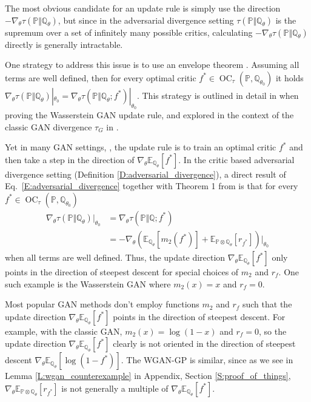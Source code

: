\documentclass{article}
\DeclareMathOperator{\oc}{OC}
\begin{document}
 The most obvious candidate for an update rule is simply use the direction $-\nabla_\theta\tau(\mathbb P\Vert\mathbb Q_\theta)$,
 but since in the adversarial divergence setting $\tau(\mathbb P\Vert\mathbb Q_\theta)$ is the supremum over a set of infinitely many possible critics,
 calculating $-\nabla_\theta\tau(\mathbb P\Vert\mathbb Q_\theta)$ directly is generally intractable.

 One strategy to address this issue is to use an envelope theorem \cite{milgrom2002envelope}.
 Assuming all terms are well defined, then for every optimal critic $f^*\in\oc_{\tau}(\mathbb P,\mathbb Q_{\theta_0})$
 it holds $\nabla_\theta\tau(\mathbb P\Vert\mathbb Q_\theta)|_{\theta_0}=\nabla_\theta\tau(\mathbb P\Vert\mathbb Q_\theta;f^*)|_{\theta_0}$.
 This strategy is outlined in detail in \cite{arjovsky2017wasserstein} when proving the Wasserstein GAN update rule,
 and explored in the context of the classic GAN divergence $\tau_G$ in \cite{arjovsky2017towards}.

 Yet in many GAN settings,
 \cite{goodfellow2014generative,arjovsky2017wasserstein,salimans2016improved,petzka2017regularization},
 the update rule is to train an optimal critic $f^*$ and then take a step in the direction of $\nabla_\theta\mathbb E_{\mathbb Q_\theta}[f^*]$.
 In the critic based adversarial divergence setting (Definition \ref{D:adversarial_divergence}), a direct result of Eq.\ \ref{E:adversarial_divergence}
 together with Theorem 1 from \cite{milgrom2002envelope} is that for every $f^*\in\oc_{\tau}(\mathbb P,\mathbb Q_{\theta_0})$
 \begin{align}
 \nonumber\nabla_\theta\tau(\mathbb P\Vert\mathbb Q_\theta)|_{\theta_0}
 &=\nabla_\theta\tau(\mathbb P\Vert\mathbb Q;f^*)\\
 \label{E:update_rule}&=-\nabla_\theta(\mathbb E_{\mathbb Q_\theta}[m_2(f^*)]+\mathbb E_{\mathbb P\otimes\mathbb Q_\theta}[r_{f^*}])|_{\theta_0}
 \end{align}
 when all terms are well defined. Thus, the update direction $\nabla_\theta\mathbb E_{\mathbb Q_\theta}[f^*]$ only points in the direction of steepest descent for special choices of $m_2$ and $r_f$.
 One such example is the Wasserstein GAN where $m_2(x)=x$ and $r_f=0$.

 Most popular GAN methods don't employ functions $m_2$ and $r_f$ such that the update direction $\nabla_\theta\mathbb E_{\mathbb Q_\theta}[f^*]$ points in the direction of steepest descent.
 For example, with the classic GAN, $m_2(x)=\log(1-x)$ and $r_f=0$, so the update direction $\nabla_\theta\mathbb E_{\mathbb Q_\theta}[f^*]$ clearly is not oriented
 in the direction of steepest descent $\nabla_\theta\mathbb E_{\mathbb Q_\theta}[\log(1-f^*)]$.
 The WGAN-GP is similar, since as we see in Lemma \ref{L:wgan_counterexample} in Appendix, Section \ref{S:proof_of_things},
 $\nabla_\theta\mathbb E_{\mathbb P\otimes\mathbb Q_\theta}[r_{f^*}]$ is not generally
 a multiple of $\nabla_\theta\mathbb E_{\mathbb Q_\theta}[f^*]$.
\end{document}
